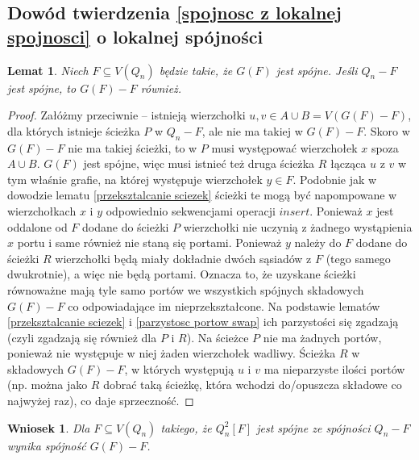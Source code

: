 \documentclass{pracamgr}
\newtheorem{lemma}[theorem]{Lemat}
\newtheorem{corollary}[theorem]{Wniosek}
\begin{document}
   \subsection{Dowód twierdzenia \ref{spojnosc z lokalnej spojnosci} o lokalnej spójności}
    \begin{lemma}\label{Q_n-F spojne => G(F)-F spojne (1 skladowa)}
     Niech $F\subseteq V(Q_n)$ będzie takie, że $G(F)$ jest spójne. Jeśli $Q_n-F$ jest spójne, to $G(F)-F$ również.
    \end{lemma}
    \begin{proof}
     Załóżmy przeciwnie -- istnieją wierzchołki $u,v\in A\cup B=V(G(F)-F)$, dla których istnieje ścieżka $P$ w $Q_n-F$, ale nie ma takiej w  $G(F)-F$.
     Skoro w $G(F)-F$ nie ma takiej ścieżki, to w $P$ musi występować wierzchołek $x$ spoza $A\cup B$.\newline
     $G(F)$ jest spójne, więc musi istnieć też druga ścieżka $R$ łącząca $u$ z $v$ w tym właśnie grafie, na której występuje wierzchołek $y\in F$.\newline
     Podobnie jak w dowodzie lematu \ref{przeksztalcanie sciezek} 
     ścieżki te mogą być napompowane w wierzchołkach $x$ i $y$ odpowiednio sekwencjami operacji $insert$.\newline
     Ponieważ $x$ jest oddalone od $F$ dodane do ścieżki $P$ wierzchołki nie uczynią z żadnego wystąpienia $x$ portu i same również nie staną się portami.
     Ponieważ $y$ należy do $F$ dodane do ścieżki $R$ wierzchołki będą miały dokładnie dwóch sąsiadów z $F$ (tego samego dwukrotnie), a więc nie będą portami.\newline
     Oznacza to, że uzyskane ścieżki równoważne mają tyle samo portów we wszystkich spójnych składowych $G(F)-F$ co odpowiadające im nieprzekształcone.
     Na podstawie lematów \ref{przeksztalcanie sciezek} i \ref{parzystosc portow swap} ich parzystości  się zgadzają (czyli zgadzają się również dla $P$ i $R$).
     Na ścieżce $P$ nie ma żadnych portów, ponieważ nie występuje w niej żaden wierzchołek wadliwy.
     Ścieżka $R$ w składowych $G(F)-F$, w których występują $u$ i $v$ ma nieparzyste ilości portów
     (np. można jako $R$ dobrać taką ścieżkę, która wchodzi do/opuszcza składowe co najwyżej raz), co daje sprzeczność.
    \end{proof}
    \begin{corollary}\label{Q_n-F spojne => Q_n^2[F]-F spojne (1 skladowa)}
     Dla $F\subseteq V(Q_n)$ takiego, że $Q_n^2[F]$ jest spójne ze spójności $Q_n-F$ wynika spójność $G(F)-F$.
    \end{corollary}
\end{document}

